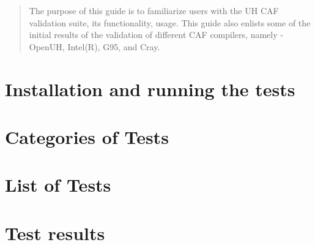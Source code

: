 \documentclass[12pt]{article}
\begin{document}
\maketitle

\begin{abstract}
The purpose of this guide is to familiarize users with the UH CAF validation suite, its functionality, usage. This guide also enlists some of the initial results of the validation of different CAF compilers, namely - OpenUH, Intel(R), G95, and Cray.
\end{abstract}

\section{Installation and running the tests}


\section{Categories of Tests}


\section{List of Tests}


\section{Test results}




\end{document}
